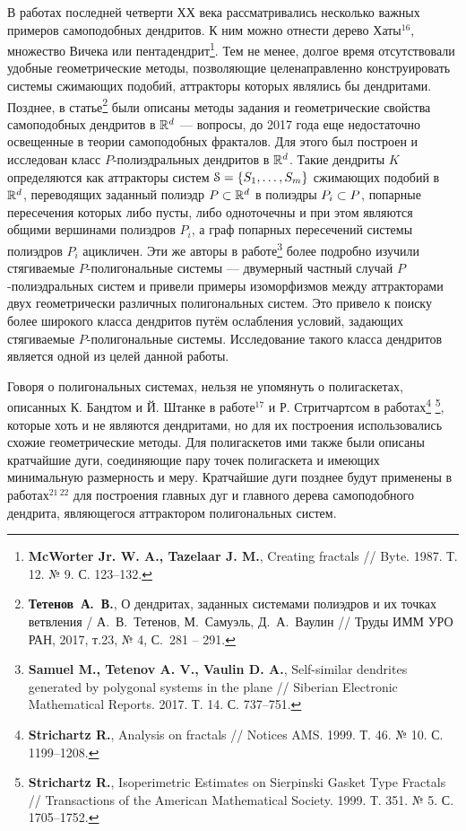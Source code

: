 \documentclass[a5paper,9pt,twoside]{extarticle} %
\begin{document}
В работах последней четверти ХХ века рассматривались несколько важных примеров самоподобных дендритов. К ним можно отнести дерево Хаты$^16$, множество Вичека или пентадендрит\footnote{{\bf McWorter Jr. W. A., Tazelaar J. M.}, Creating fractals // Byte. 1987. Т. 12. № 9. С. 123--132.}.
Тем не менее, долгое время отсутствовали удобные геометрические методы, позволяющие целенаправленно конструировать  системы сжимающих подобий, аттракторы которых являлись бы дендритами.
Позднее, в статье\footnote{{\bf Тетенов~А.~В.},  О дендритах, заданных системами полиэдров и их точках ветвления / А.~В.~Тетенов, М.~Самуэль, Д.~А.~Ваулин // Труды ИММ УРО РАН, 2017, т.23, № 4, С.~281 -- 291.} были описаны методы задания и геометрические свойства самоподобных дендритов в $\mathbb{R}^d$ --- вопросы, до 2017 года еще недостаточно освещенные в теории самоподобных фракталов. 
Для этого был построен и исследован класс $P$-полиэдральных дендритов в $\mathbb{R}^d$. 
Такие дендриты $K$ определяются как аттракторы систем ${\EuScript S} = \{S_1,\ldots, S_m\}$ сжимающих подобий в $\mathbb{R}^d$, переводящих заданный полиэдр $P \subset \mathbb{R}^d$ в полиэдры $P_i \subset P$, попарные пересечения которых либо пусты, либо одноточечны и при этом являются общими вершинами  полиэдров $P_i $, а граф попарных пересечений системы полиэдров $P_i$ ацикличен.
Эти же авторы  в работе\footnote{{\bf Samuel M., Tetenov A. V., Vaulin D. A.}, Self-similar dendrites generated by polygonal systems in the plane // Siberian Electronic Mathematical Reports. 2017. Т. 14. С. 737--751.}  более подробно изучили стягиваемые $P$-полигональные системы --- двумерный частный случай $P$-полиэдральных систем  и привели
примеры изоморфизмов между аттракторами двух геометрически различных полигональных систем.
Это привело к поиску более широкого класса дендритов путём ослабления условий, задающих стягиваемые $P$-полигональные системы.
Исследование такого класса дендритов является одной из целей данной работы.

Говоря о полигональных системах, нельзя не упомянуть о полигаскетах, описанных К. Бандтом и Й. Штанке в работе$^{17}$ и Р. Стритчартсом в работах\footnote{{\bf Strichartz R.}, Analysis on fractals // Notices AMS. 1999. Т. 46. № 10. С. 1199--1208.} \footnote{{\bf Strichartz R.}, Isoperimetric Estimates on Sierpinski Gasket Type Fractals // Transactions of the American Mathematical Society. 1999. Т. 351. № 5. С. 1705--1752.}, которые хоть и не являются дендритами, но для их построения использовались схожие геометрические методы.
Для полигаскетов ими также были описаны кратчайшие дуги, соединяющие пару точек полигаскета и имеющих минимальную размерность и меру.
Кратчайшие дуги позднее будут применены в работах$^{21\ 22}$ для построения главных дуг и главного дерева самоподобного дендрита, являющегося аттрактором полигональных систем.
\end{document}
